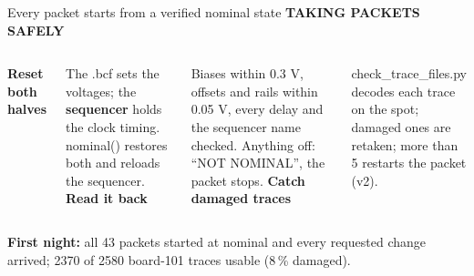 \documentclass[aspectratio=169,11pt]{beamer}
\newcommand{\eyebrow}[2][trace]{{\color{#1}\scriptsize\bfseries\MakeUppercase{#2}}\par\vspace{0.2em}}
\begin{document}
\begin{frame}{Every packet starts from a verified nominal state}
\eyebrow{Taking packets safely}
\begin{columns}[T]
{\color{trace}\bfseries Reset both halves}\par\small The .bcf sets the voltages; the \textbf{sequencer} holds the clock timing. nominal() restores both and reloads the sequencer.
{\color{model}\bfseries Read it back}\par\small Biases within 0.3 V, offsets and rails within 0.05 V, every delay and the sequencer name checked. Anything off: ``NOT NOMINAL'', the packet stops.
{\color{problem}\bfseries Catch damaged traces}\par\small check\_trace\_files.py decodes each trace on the spot; damaged ones are retaken; more than 5 restarts the packet (v2).
\end{columns}
\vspace{1.5em}
\colorbox{soft}{\parbox{0.95\textwidth}{\small\textbf{First night:} all 43 packets started at nominal and every requested change arrived; 2370 of 2580 board-101 traces usable (8\,\% damaged).}}
\end{frame}
\end{document}
